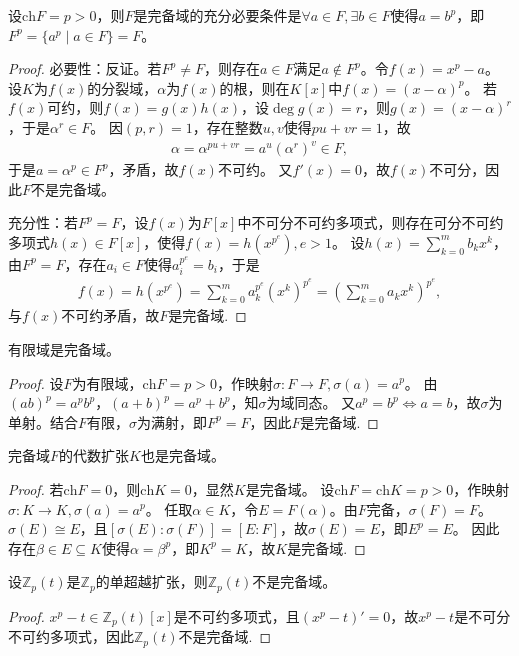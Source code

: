 \documentclass[../../main.tex]{subfiles}%
\begin{document}
\begin{theorem}
设$\mathrm{ch}F=p>0$，则$F$是完备域的充分必要条件是$\forall a\in F,\exists b\in F$使得$a=b^p$，即$F^p=\{a^p\mid a\in F\}=F$。
\end{theorem}

\begin{proof}
必要性：反证。若$F^p\neq F$，则存在$a\in F$满足$a\notin F^p$。令$f(x)=x^p-a$。
设$K$为$f(x)$的分裂域，$\alpha$为$f(x)$的根，则在$K[x]$中$f(x)=(x-\alpha)^p$。
若$f(x)$可约，则$f(x)=g(x)h(x)$，设$\deg g(x)=r$，则$g(x)=(x-\alpha)^r$，于是$\alpha^r\in F$。
因$(p,r)=1$，存在整数$u,v$使得$pu+vr=1$，故
\begin{align*}
\alpha=\alpha^{pu+vr}=a^u(\alpha^r)^v\in F,
\end{align*}
于是$a=\alpha^p\in F^p$，矛盾，故$f(x)$不可约。
又$f'(x)=0$，故$f(x)$不可分，因此$F$不是完备域。

充分性：若$F^p=F$，设$f(x)$为$F[x]$中不可分不可约多项式，则存在可分不可约多项式$h(x)\in F[x]$，使得$f(x)=h(x^{p^e}),e>1$。
设$h(x)=\sum\limits_{k=0}^m b_kx^k$，由$F^p=F$，存在$a_i\in F$使得$a_i^{p^e}=b_i$，于是
\begin{align*}
f(x)=h(x^{p^e})=\sum\limits_{k=0}^m a_k^{p^e}(x^k)^{p^e}=\left(\sum\limits_{k=0}^m a_kx^k\right)^{p^e},
\end{align*}
与$f(x)$不可约矛盾，故$F$是完备域.
\end{proof}

\begin{corollary}
有限域是完备域。
\end{corollary}

\begin{proof}
设$F$为有限域，$\mathrm{ch}F=p>0$，作映射$\sigma:F\to F,\sigma(a)=a^p$。
由$(ab)^p=a^pb^p$，$(a+b)^p=a^p+b^p$，知$\sigma$为域同态。
又$a^p=b^p\iff a=b$，故$\sigma$为单射。结合$F$有限，$\sigma$为满射，即$F^p=F$，因此$F$是完备域.
\end{proof}

\begin{corollary}
完备域$F$的代数扩张$K$也是完备域。
\end{corollary}

\begin{proof}
若$\mathrm{ch}F=0$，则$\mathrm{ch}K=0$，显然$K$是完备域。
设$\mathrm{ch}F=\mathrm{ch}K=p>0$，作映射$\sigma:K\to K,\sigma(a)=a^p$。
任取$\alpha\in K$，令$E=F(\alpha)$。由$F$完备，$\sigma(F)=F$。
$\sigma(E)\cong E$，且$[\sigma(E):\sigma(F)]=[E:F]$，故$\sigma(E)=E$，即$E^p=E$。
因此存在$\beta\in E\subseteq K$使得$\alpha=\beta^p$，即$K^p=K$，故$K$是完备域.
\end{proof}

\begin{corollary}
设$\mathbb{Z}_p(t)$是$\mathbb{Z}_p$的单超越扩张，则$\mathbb{Z}_p(t)$不是完备域。
\end{corollary}

\begin{proof}
$x^p-t\in\mathbb{Z}_p(t)[x]$是不可约多项式，且$(x^p-t)'=0$，故$x^p-t$是不可分不可约多项式，因此$\mathbb{Z}_p(t)$不是完备域.
\end{proof}
\end{document}
